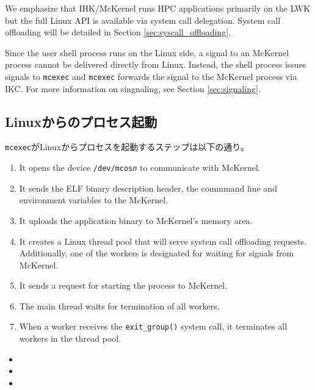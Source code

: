 \documentclass[twoside,11pt,fleqn]{book}
\begin{document}
We emphasize that IHK/McKernel runs HPC applications primarily on the LWK
but the full Linux API is available via system call delegation.
System call offloading will be detailed in Section \ref{sec:syscall_offloading}.

Since the user shell process runs on the Linux side, a signal to an
McKernel process cannot be delivered directly from Linux.
Instead, the shell process issues signals to \texttt{mcexec}
and \texttt{mcexec} forwards the signal to the McKernel process
via IKC. For more information on singnaling, see Section \ref{sec:signaling}.

\subsection{Linuxからのプロセス起動}\label{sec:proc_launch}
\texttt{mcexec}がLinuxからプロセスを起動するステップは以下の通り。
\begin{enumerate}
\item It opens the device \texttt{/dev/mcos\textit{n}} to communicate with
McKernel.
\item It sends the ELF binary description header, the commmand line
and environment variables to the McKernel. %
\item It uploads the application binary to McKernel's memory area.
\item It creates a Linux thread pool that will serve system call offloading
requests. Additionally, one of the workers is designated for waiting for
signals from McKernel.
\item It sends a request for starting the process to McKernel.
\item The main thread waits for termination of all workers.
\item When a worker receives the \texttt{exit\_group()} system call,
it terminates all workers in the thread pool.
\end{enumerate}

\begin{itemize}
\item {}
\item {}
\item {}
\end{itemize}
\end{document}
